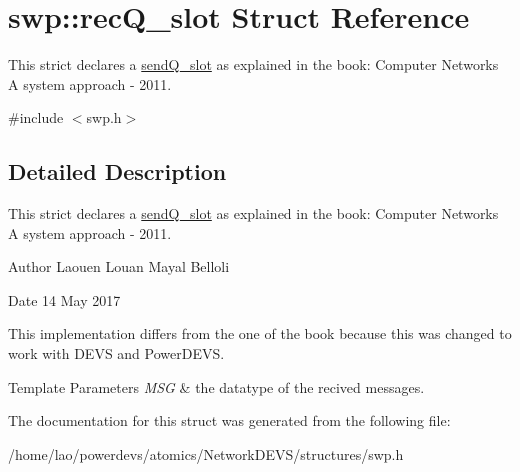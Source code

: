 \hypertarget{structswp_1_1recQ__slot}{}\section{swp\+:\+:rec\+Q\+\_\+slot Struct Reference}
\label{structswp_1_1recQ__slot}


This strict declares a \hyperlink{structswp_1_1sendQ__slot}{send\+Q\+\_\+slot} as explained in the book\+: Computer Networks A system approach -\/ 2011.  




{\ttfamily \#include $<$swp.\+h$>$}



\subsection{Detailed Description}
This strict declares a \hyperlink{structswp_1_1sendQ__slot}{send\+Q\+\_\+slot} as explained in the book\+: Computer Networks A system approach -\/ 2011. 

\begin{DoxyAuthor}{Author}
Laouen Louan Mayal Belloli 
\end{DoxyAuthor}
\begin{DoxyDate}{Date}
14 May 2017
\end{DoxyDate}
This implementation differs from the one of the book because this was changed to work with D\+E\+VS and Power\+D\+E\+VS.


\begin{DoxyTemplParams}{Template Parameters}
{\em M\+SG} & the datatype of the recived messages. \\
\hline
\end{DoxyTemplParams}


The documentation for this struct was generated from the following file\+:\begin{DoxyCompactItemize}
\item 
/home/lao/powerdevs/atomics/\+Network\+D\+E\+V\+S/structures/swp.\+h\end{DoxyCompactItemize}
